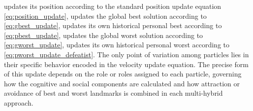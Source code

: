 {%
updates its position according to the standard position update equation \eqref{eq:position_update},
updates the global best solution according to \eqref{eq:gbest_update},
updates its own historical personal best according to \eqref{eq:pbest_update},
updates the global worst solution according to \eqref{eq:gworst_update},
updates its own historical personal worst according to \eqref{eq:pworst_update_defeatist}.
The only point of variation among particles lies in their specific behavior encoded in the velocity update equation. The precise form of this update depends on the role or roles assigned to each particle, governing how the cognitive and social components are calculated and how attraction or avoidance of best and worst landmarks is combined in each multi-hybrid approach. 

}
